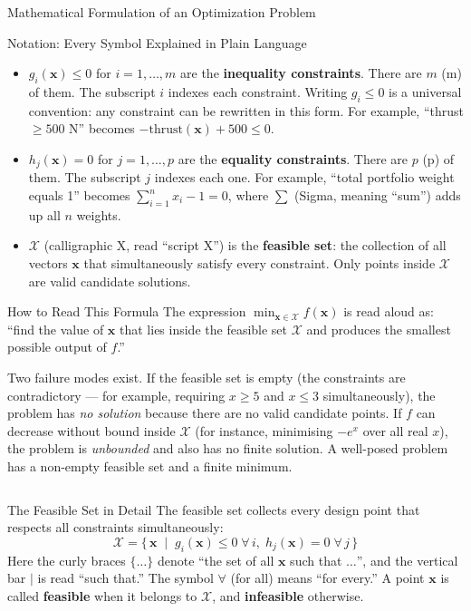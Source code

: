 \documentclass[aspectratio=169,10pt]{beamer}
\newcommand{\vx}{\mathbf{x}}
\begin{document}
\begin{frame}[allowframebreaks]{Mathematical Formulation of an Optimization Problem}
\begin{block}{Notation: Every Symbol Explained in Plain Language}
\begin{itemize}
      \item $g_i(\vx) \leq 0$ for $i = 1, \ldots, m$ are the
        \textbf{inequality constraints}.  There are $m$ (m) of them.
        The subscript $i$ indexes each constraint.
        Writing $g_i \leq 0$ is a universal convention: any constraint can be
        rewritten in this form.  For example, ``thrust $\geq 500$ N'' becomes
        $-\text{thrust}(\vx) + 500 \leq 0$.

      \item $h_j(\vx) = 0$ for $j = 1, \ldots, p$ are the
        \textbf{equality constraints}.  There are $p$ (p) of them.
        The subscript $j$ indexes each one.
        For example, ``total portfolio weight equals 1'' becomes
        $\sum_{i=1}^n x_i - 1 = 0$, where $\sum$ (Sigma, meaning ``sum'')
        adds up all $n$ weights.

      \item $\mathcal{X}$ (calligraphic X, read ``script X'') is the
        \textbf{feasible set}: the collection of all vectors $\vx$ that
        simultaneously satisfy every constraint.  Only points inside
        $\mathcal{X}$ are valid candidate solutions.
    \end{itemize}
  \end{block}

  \begin{alertblock}{How to Read This Formula}
    The expression $\min_{\vx \in \mathcal{X}} f(\vx)$ is read aloud as:
    ``find the value of $\vx$ that lies inside the feasible set $\mathcal{X}$
    and produces the smallest possible output of $f$.''

    Two failure modes exist.
    If the feasible set is empty (the constraints are contradictory --- for
    example, requiring $x \geq 5$ and $x \leq 3$ simultaneously), the problem
    has \emph{no solution} because there are no valid candidate points.
    If $f$ can decrease without bound inside $\mathcal{X}$ (for instance,
    minimising $-e^{x}$ over all real $x$), the problem is \emph{unbounded}
    and also has no finite solution.  A well-posed problem has a non-empty
    feasible set and a finite minimum.
  \end{alertblock}

  \framebreak

  \begin{columns}[T]
      \begin{block}{The Feasible Set in Detail}
        The feasible set collects every design point that respects all
        constraints simultaneously:
        \[
          \mathcal{X} = \{\,\vx \;\mid\; g_i(\vx)\leq 0 \;\forall\,i,\;
          h_j(\vx)=0 \;\forall\,j\,\}
        \]
        Here the curly braces $\{\ldots\}$ denote ``the set of all $\vx$ such
        that $\ldots$'', and the vertical bar $\mid$ is read ``such that.''
        The symbol $\forall$ (for all) means ``for every.''
        A point $\vx$ is called \textbf{feasible} when it belongs to
        $\mathcal{X}$, and \textbf{infeasible} otherwise.


\end{block}
\end{columns}
\end{frame}
\end{document}
